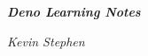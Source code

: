 \pagestyle{empty}

\vspace*{8cm}
\begin{center}
    \Huge\textit{\textbf{Deno Learning Notes}}
\end{center}

\vspace*{8cm}
\begin{center}
    \textit{Kevin Stephen}
\end{center}
